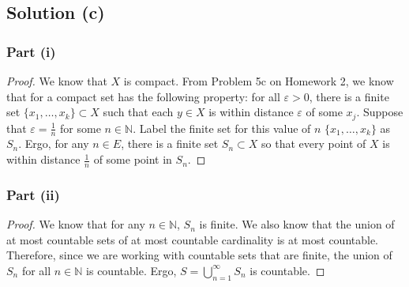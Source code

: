 \documentclass[11pt]{article}
\begin{document}
    \pagebreak
    \subsection{Solution (c)}
        \subsubsection{Part (i)}
            \begin{proof}
                We know that $X$ is compact.
                From Problem 5c on Homework 2, we know that for a compact set has the following property: for all $\varepsilon > 0$, there is a finite set $\{x_1, \dots, x_k\} \subset X$ such that each $y \in X$ is within distance $\varepsilon$ of some $x_j$.
                Suppose that $\varepsilon = \frac{1}{n}$ for some $n \in \mathbb{N}$.
                Label the finite set for this value of $n$ $\{x_1, \dots, x_k\}$ as $S_n$.
                Ergo, for any $n \in E$, there is a finite set $S_n \subset X$ so that every point of $X$ is within distance $\frac{1}{n}$ of some point in $S_n$. 
            \end{proof}
        \subsubsection{Part (ii)}
            \begin{proof}
                We know that for any $n \in \mathbb{N}$, $S_n$ is finite.
                We also know that the union of at most countable sets of at most countable cardinality is at most countable.
                Therefore, since we are working with countable sets that are finite, the union of $S_n$ for all $n \in \mathbb{N}$ is countable.
                Ergo, $S = \bigcup\limits_{n = 1}^{\infty} S_n$ is countable.
            \end{proof}
\end{document}
